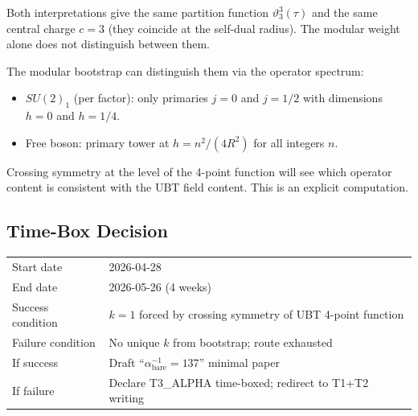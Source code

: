 \documentclass[12pt,a4paper]{article}
\theoremstyle{definition}
\theoremstyle{remark}
\begin{document}
Both interpretations give the same partition function $\vartheta_3^3(\tau)$ and the
same central charge $c = 3$ (they coincide at the self-dual radius).  The modular
weight alone does not distinguish between them.

\medskip
The modular bootstrap can distinguish them via the operator spectrum:
\begin{itemize}
  \item $SU(2)_1$ (per factor): only primaries $j = 0$ and $j = 1/2$ with
        dimensions $h = 0$ and $h = 1/4$.
  \item Free boson: primary tower at $h = n^2/(4R^2)$ for all integers $n$.
\end{itemize}
Crossing symmetry at the level of the 4-point function will see which operator
content is consistent with the UBT field content.  This is an explicit computation.

\subsection{Time-Box Decision}

\begin{center}
\begin{tabular}{ll}
\toprule
Start date & 2026-04-28 \\
End date & 2026-05-26 (4 weeks) \\
\midrule
Success condition & $k = 1$ forced by crossing symmetry of UBT 4-point function \\
Failure condition & No unique $k$ from bootstrap; route exhausted \\
\midrule
If success & Draft ``$\alpha^{-1}_{\mathrm{bare}} = 137$'' minimal paper \\
If failure & Declare T3\_ALPHA time-boxed; redirect to T1+T2 writing \\
\bottomrule
\end{tabular}
\end{center}

\ifdefined\INCLUDEMODE
\else
  
\end{document}
